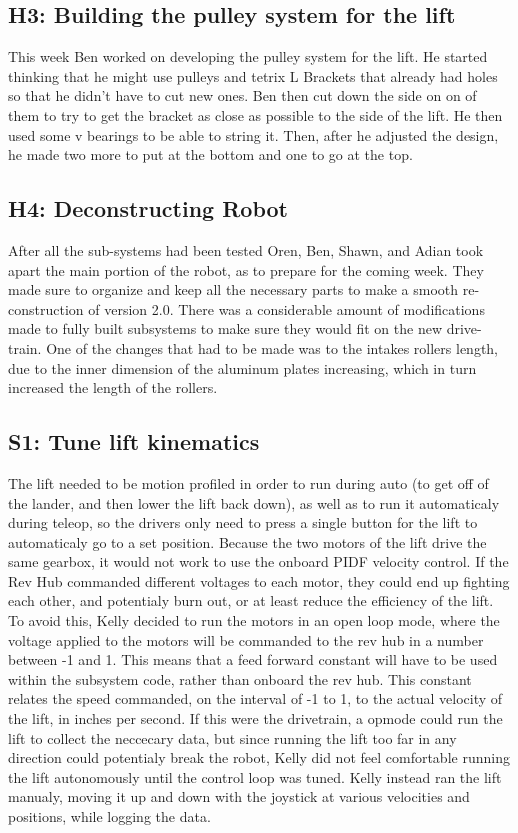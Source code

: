 \documentclass{article}
\begin{document}
\subsection{H3: Building the pulley system for the lift}

This week Ben worked on developing the pulley system for the lift. He started thinking that he might use pulleys and tetrix L Brackets that already had holes so that he didn't have to cut new ones. Ben then cut down the side on on of them to try to get the bracket as close as possible to the side of the lift. He then used some v bearings to be able to string it. Then, after he adjusted the design, he made two more to put at the bottom and one to go at the top.

\subsection{H4: Deconstructing Robot}

After all the sub-systems had been tested Oren, Ben, Shawn, and Adian took apart the main portion of the robot, as to prepare for the coming week. They made sure to organize and keep all the necessary parts to make a smooth re-construction of version 2.0. There was a considerable amount of modifications made to fully built subsystems to make sure they would fit on the new drive-train. One of the changes that had to be made was to the intakes rollers length, due to the inner dimension of the aluminum plates increasing, which in turn increased the length of the rollers. 
\subsection{S1: Tune lift kinematics}

The lift needed to be motion profiled in order to run during auto (to get off of the lander, and then lower the lift back down), as well as to run it automaticaly during teleop, so the drivers only need to press a single button for the lift to automaticaly go to a set position. Because the two motors of the lift drive the same gearbox, it would not work to use the onboard PIDF velocity control. If the Rev Hub commanded different voltages to each motor, they could end up fighting each other, and potentialy burn out, or at least reduce the efficiency of the lift. To avoid this, Kelly decided to run the motors in an open loop mode, where the voltage applied to the motors will be commanded to the rev hub in a number between -1 and 1. This means that a feed forward constant will have to be used within the subsystem code, rather than onboard the rev hub. This constant relates the speed commanded, on the interval of -1 to 1, to the actual velocity of the lift, in inches per second. If this were the drivetrain, a opmode could run the lift to collect the neccecary data, but since running the lift too far in any direction could potentialy break the robot, Kelly did not feel comfortable running the lift autonomously until the control loop was tuned. Kelly instead ran the lift manualy, moving it up and down with the joystick at various velocities and positions, while logging the data. 
\end{document}

